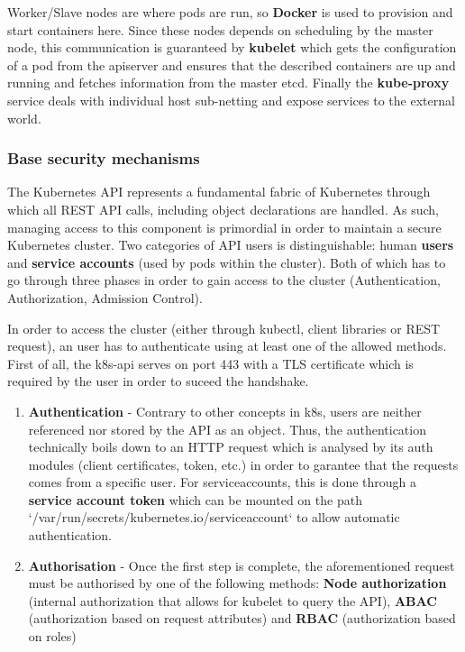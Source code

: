 \documentclass[11pt]{article}
\begin{document}

\vspace{-5mm}\hspace{5mm} Worker/Slave nodes are where pods are run, so \textbf{Docker} is used to provision and start containers here. Since these nodes depends on scheduling by the master node, this communication is guaranteed by \textbf{kubelet} which gets the configuration of a pod from the apiserver and ensures that the described containers are up and running and fetches information from the master etcd. Finally the \textbf{kube-proxy} service deals with individual host sub-netting and expose services to the external world. 

\subsubsection{Base security mechanisms}

\vspace{-5mm}\hspace{5mm}The Kubernetes API represents a fundamental fabric of Kubernetes through which all REST API calls, including object declarations are handled. As such, managing access to this component is primordial in order to maintain a secure Kubernetes cluster. Two categories of API users is distinguishable: human \textbf{users} and \textbf{service accounts} (used by pods within the cluster). Both of which has to go through three phases in order to gain access to the cluster (Authentication, Authorization, Admission Control).

\vspace{3mm}
In order to access the cluster (either through kubectl, client libraries or REST request), an user has to authenticate using at least one of the allowed methods. First of all, the k8s-api serves on port 443 with a TLS certificate which is required by the user in order to suceed the handshake. 

\begin{enumerate}
    \item \textbf{Authentication} - Contrary to other concepts in k8s, users are neither referenced nor stored by the API as an object. Thus, the authentication technically boils down to an HTTP request which is analysed by its auth modules (client certificates, token, etc.) in order to garantee that the requests comes from a specific user. For serviceaccounts, this is done through a \textbf{service account token} which can be mounted on the path `/var/run/secrets/kubernetes.io/serviceaccount` to allow automatic authentication.
    
    \item \textbf{Authorisation} - Once the first step is complete, the aforementioned request must be authorised by one of the following methods: \textbf{Node authorization} (internal authorization that allows for kubelet to query the API), \textbf{ABAC}  (authorization based on request attributes) and \textbf{RBAC} (authorization based on roles)
\end{enumerate}
\end{document}

